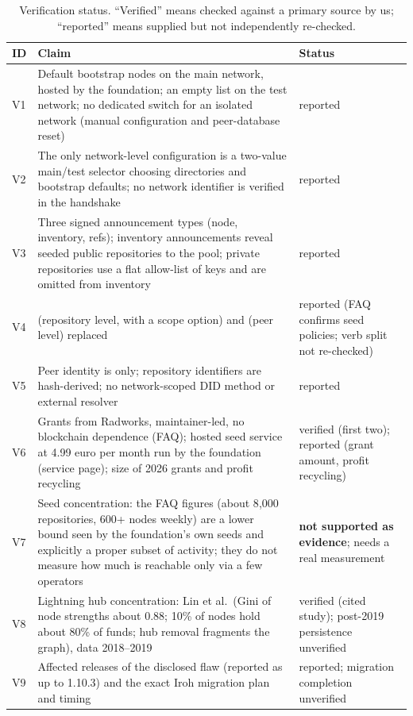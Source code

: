 \documentclass[a4paper,11pt,twoside,parskip=half-,headings=small]{scrartcl}
\begin{document}
\begin{table}[H]
\centering\small
\begin{tabularx}{\textwidth}{@{}L{0.8cm}YL{2.5cm}@{}}
\toprule
\textbf{ID} & \textbf{Claim} & \textbf{Status} \\
\midrule
V1 & Default bootstrap nodes on the main network, hosted by the foundation; an empty list on the test network; no dedicated switch for an isolated network (manual configuration and peer-database reset) & reported \\
V2 & The only network-level configuration is a two-value main/test selector choosing directories and bootstrap defaults; no network identifier is verified in the handshake & reported \\
V3 & Three signed announcement types (node, inventory, refs); inventory announcements reveal seeded public repositories to the pool; private repositories use a flat allow-list of keys and are omitted from inventory & reported \\
V4 &  (repository level, with a scope option) and  (peer level) replaced  & reported (FAQ confirms seed policies; verb split not re-checked) \\
V5 & Peer identity is  only; repository identifiers are hash-derived; no network-scoped DID method or external resolver & reported \\
V6 & Grants from Radworks, maintainer-led, no blockchain dependence (FAQ); hosted seed service at 4.99 euro per month run by the foundation (service page); size of 2026 grants and profit recycling & verified (first two); reported (grant amount, profit recycling) \\
V7 & Seed concentration: the FAQ figures (about 8{,}000 repositories, 600+ nodes weekly) are a lower bound seen by the foundation's own seeds and explicitly a proper subset of activity; they do not measure how much is reachable only via a few operators & \textbf{not supported as evidence}; needs a real measurement \\
V8 & Lightning hub concentration: Lin et al.\ (Gini of node strengths about 0.88; 10\% of nodes hold about 80\% of funds; hub removal fragments the graph), data 2018--2019 & verified (cited study); post-2019 persistence unverified \\
V9 & Affected releases of the disclosed flaw (reported as up to 1.10.3) and the exact Iroh migration plan and timing & reported; migration completion unverified \\
\bottomrule
\end{tabularx}
\caption{Verification status. ``Verified'' means checked against a primary source by us; ``reported'' means supplied but not independently re-checked.}
\end{table}
\end{document}
